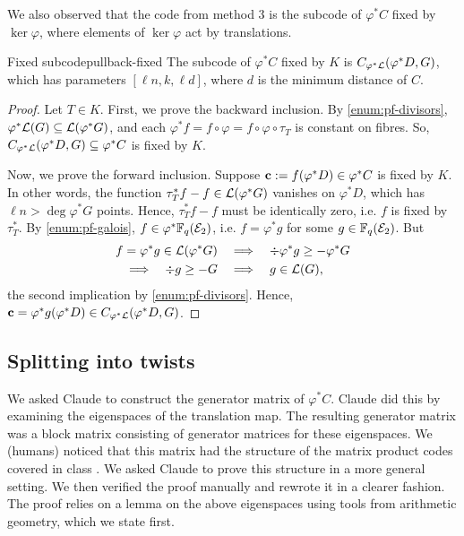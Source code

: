 \documentclass[twocolumn, 11pt]{scrartcl}
\begin{document}
We also observed that the code from method 3 is the subcode of $\varphi^*C$ fixed by $\ker\varphi$, where elements of $\ker\varphi$ act by translations.

\begin{proposition}{Fixed subcode}{pullback-fixed}
    The subcode of $\varphi^*C$ fixed by $K$ is $C_{\varphi^*\mathcal{L}}(\varphi^*D,G)$, which has parameters $[\ell n,k,\ell d]$, where $d$ is the minimum distance of $C$.
\end{proposition}

\begin{proof}
Let $T\in K$. First, we prove the backward inclusion. By \ref{enum:pf-divisors}, $\varphi^*\mathcal{L}(G)\subseteq\mathcal{L}(\varphi^*G)$, and each $\varphi^*f=f\circ\varphi=f\circ\varphi\circ\tau_T$ is constant on fibres. So, $C_{\varphi^*\mathcal{L}}(\varphi^*D,G)\subseteq\varphi^*C$ is fixed by $K$.

Now, we prove the forward inclusion. Suppose $\mathbf{c}:=f(\varphi^*D)\in\varphi^*C$ is fixed by $K$. In other words, the function $\tau_T^*f-f\in\mathcal{L}(\varphi^*G)$ vanishes on $\varphi^*D$, which has $\ell n>\deg\varphi^*G$ points. Hence, $\tau_T^*f-f$ must be identically zero, i.e. $f$ is fixed by $\tau_T^*$. By \ref{enum:pf-galois}, $f\in\varphi^*\mathbb{F}_q(\mathcal{E}_2)$, i.e. $f=\varphi^*g$ for some $g\in\mathbb{F}_q(\mathcal{E}_2)$. But
\begin{align*}
    f=\varphi^*g\in\mathcal{L}(\varphi^*G) &\quad\Longrightarrow\quad \div\varphi^*g\geq-\varphi^*G \\
    \Longrightarrow\quad \div g\geq-G
    &\quad\Longrightarrow\quad g\in\mathcal{L}(G),
\end{align*}
the second implication by \ref{enum:pf-divisors}. Hence, $\mathbf{c}=\varphi^*g(\varphi^*D)\in C_{\varphi^*\mathcal{L}}(\varphi^*D,G)$.
\end{proof}

\subsection{Splitting into twists} \label{subsection:splitting}

We asked Claude to construct the generator matrix of $\varphi^*C$. Claude did this by examining the eigenspaces of the translation map. The resulting generator matrix was a block matrix consisting of generator matrices for these eigenspaces. We (humans) noticed that this matrix had the structure of the matrix product codes covered in class \cite{mh4310ld7,blackmore2001matrix}. We asked Claude to prove this structure in a more general setting. We then verified the proof manually and rewrote it in a clearer fashion. The proof relies on a lemma on the above eigenspaces using tools from arithmetic geometry, which we state first.
\end{document}
